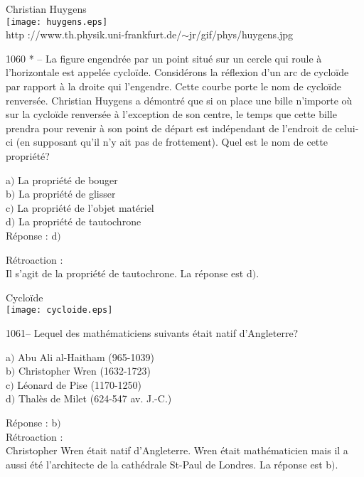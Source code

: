 ﻿\documentclass[letterpaper, 12pt]{article}
\begin{document}
        \begin{center}
        Christian Huygens\\
    \texttt{[image: huygens.eps]}\\
        {\footnotesize http
://www.th.physik.uni-frankfurt.de/$\sim$jr/gif/phys/huygens.jpg}
    \end{center}


1060 * -- La figure engendr\'ee par un point situ\'e sur un cercle
qui roule \`a l'horizontale est appel\'ee cyclo\"ide. Consid\'erons
la r\'eflexion d'un arc de cyclo\"ide par rapport \`a la droite qui
l'engendre. Cette courbe porte le nom de cyclo\"ide renvers\'ee.
Christian Huygens a d\'emontr\'e que si on place une bille n'importe
o\`u sur la cyclo\"ide renvers\'ee \`a l'exception de son centre, le
temps que cette bille prendra pour revenir \`a son point de d\'epart
est ind\'ependant de l'endroit de celui-ci (en supposant qu'il n'y
ait pas de frottement). Quel est le nom de cette propri\'et\'e?

a$)$ La propri\'et\'e de bouger  \\
b$)$ La propri\'et\'e de glisser  \\
c$)$ La propri\'et\'e de l'objet mat\'eriel \\
d$)$ La propri\'et\'e de tautochrone \\

R\'eponse : d$)$

R\'etroaction : \\
Il s'agit de la propri\'et\'e de tautochrone.
La r\'eponse est d$)$.\\

        \begin{center}

Cyclo\"ide        \\
    \texttt{[image: cycloide.eps]}\\
    \end{center}

1061-- Lequel des math\'ematiciens suivants \'etait natif
d'Angleterre?

a$)$ Abu Ali al-Haitham (965-1039) \\
b$)$ Christopher Wren (1632-1723) \\
c$)$ L\'eonard de Pise (1170-1250) \\
d$)$ Thal\`es de Milet (624-547 av. J.-C.)

R\'eponse : b$)$\\

R\'etroaction : \\
Christopher Wren \'etait natif d'Angleterre. Wren \'etait
math\'ematicien mais il a aussi \'et\'e l'architecte de la
cath\'edrale St-Paul de Londres.
La r\'eponse est b$)$.\\
\end{document}
